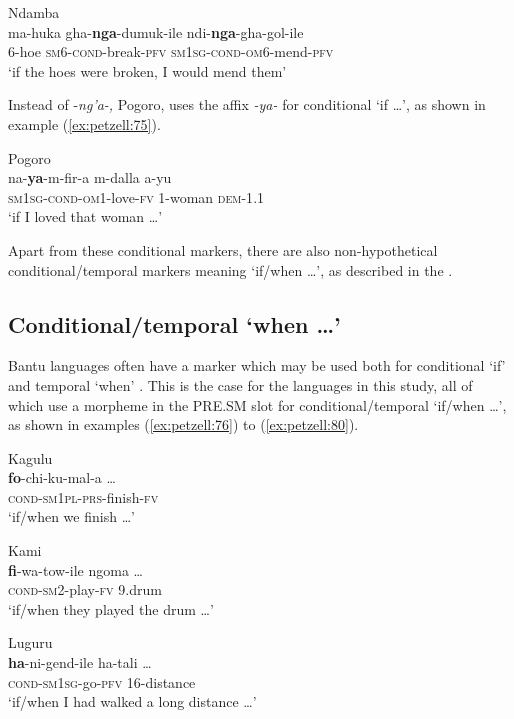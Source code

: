 \documentclass[output=paper,
            colorlinks, citecolor=brown
            ,draftmode
		  ]{langscibook}
\begin{document}
\ea\label{ex:petzell:74}Ndamba\\
\gll ma-huka   gha-\textbf{nga}{}-dumuk-ile      ndi\nobreakdash-\textbf{nga}{}-gha-gol-ile \\
{6}\textsc{{}-}{hoe} \textsc{sm}{6}\textsc{{}-{cond}{}-}{break}\textsc{{}-pfv}    \textsc{sm}{1}\textsc{sg-{cond}{}-om}{6}\textsc{{}-}{mend}\textsc{{}-pfv}\\
\glt `if the hoes were broken, I would mend them'
\z


Instead of -\textit{ng'a-,} Pogoro, uses the affix \textit{{}-ya-} for conditional `if \ldots', as shown in example (\ref{ex:petzell:75}).


\ea\label{ex:petzell:75}Pogoro\\
\gll na-\textbf{ya}{}-m-fir-a             m-dalla    a-yu \\
\textsc{sm}1\textsc{sg}{}-\textsc{{cond}}{}-\textsc{om}1-love-\textsc{fv} 1-woman    \textsc{dem-1}.1\\
\glt `if I loved that woman \ldots'
\z


Apart from these conditional markers, there are also non-hypothetical conditional\slash temporal markers meaning `if/when \ldots', as described in the .


\subsection{Conditional/temporal `when \ldots'}
\label{sec:petzell:4.4}
Bantu languages often have a marker which may be used both for conditional `if' and temporal `when' \citep[75]{Doke1935}. This is the case for the languages in this study, all of which use a morpheme in the PRE.SM slot for conditional/temporal `if/when \ldots', as shown in examples (\ref{ex:petzell:76}) to (\ref{ex:petzell:80}).


\ea\label{ex:petzell:76}Kagulu\\
\gll \textbf{fo}{}-chi-ku-mal-a \ldots \\
\textsc{cond}-\textsc{sm}1\textsc{pl}{}-\textsc{prs}{}-finish-\textsc{fv}\\
\glt `if/when we finish \ldots'


\ex\label{ex:petzell:77}Kami\\
\gll \textbf{fi}{}-wa-tow-ile        ngoma \ldots  \\
\textsc{cond{}-sm}2-play-\textsc{fv}    9.drum\\
\glt `if/when they played the drum \ldots'


\ex\label{ex:petzell:78} Luguru\\
\gll \textbf{ha}{}-ni-gend-ile         ha-tali \ldots \\
\textsc{cond}{}-\textsc{sm}1\textsc{sg}{}-go-\textsc{pfv} 16-distance\\
\glt `if/when I had walked a long distance \ldots'
\end{document}
